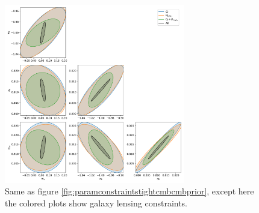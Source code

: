 \documentclass[11pt]{article} %
\begin{document}
\begin{figure}
    \centering
    \includegraphics[width=0.7\textwidth]{figures/param_constraints_tight_gal_cmb_prior.pdf}
    \caption{Same as figure \ref{fig:paramconstraintstightcmbcmbprior}, except here the colored plots show galaxy lensing constraints.}
    \label{fig:paramconstraintstightgalcmbprior}
\end{figure}


\end{document}
